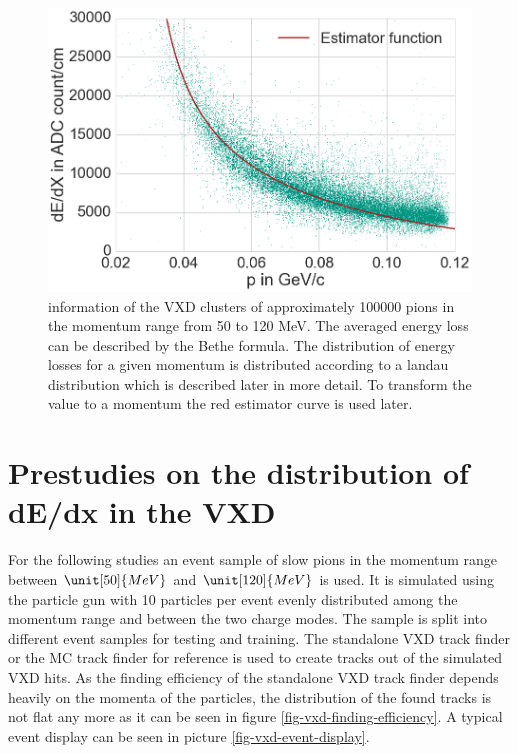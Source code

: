 \begin{figure}
 \centering
 \includegraphics[width=0.8\linewidth]{figures/vxd/dedxWithEstimator.png}
 \caption[\dedx information of the VXD clusters.]{\dedx information of the VXD clusters of approximately 100000 pions in the momentum range from 50 to 120 MeV. The averaged energy loss can be described by the Bethe formula. The distribution of energy losses for a given momentum is distributed according to a landau distribution which is described later in more detail. To transform the \dedx value to a momentum the red estimator curve is used later.}
 \label{fig-dedx-over-p}
\end{figure}


\section{Prestudies on the distribution of dE/dx in the VXD}

For the following studies an event sample of slow pions in the momentum range between $\unit[50]{MeV}$ and $\unit[120]{MeV}$ is used. It is simulated using the particle gun with 10 particles per event evenly distributed among the momentum range and between the two charge modes. The sample is split into different event samples for testing and training. The standalone VXD track finder or the MC track finder for reference is used to create tracks out of the simulated VXD hits. As the finding efficiency of the standalone VXD track finder depends heavily on the momenta of the particles, the distribution of the found tracks is not flat any more as it can be seen in figure \ref{fig-vxd-finding-efficiency}. A typical event display can be seen in picture \ref{fig-vxd-event-display}.

